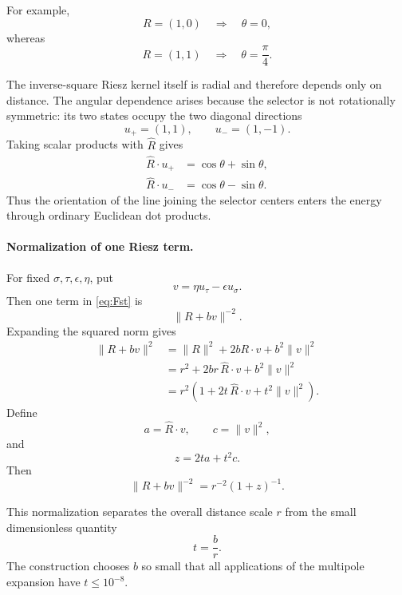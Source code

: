 \documentclass[12pt,a4paper]{article}
\newcommand{\norm}[1]{\lVert #1\rVert}
\begin{document}
For example,
\[
R=(1,0)
\quad\Longrightarrow\quad
\theta=0,
\]
whereas
\[
R=(1,1)
\quad\Longrightarrow\quad
\theta=\frac{\pi}{4}.
\]

The inverse-square Riesz kernel itself is radial and therefore depends
only on distance.  The angular dependence arises because the selector
is not rotationally symmetric: its two states occupy the two diagonal
directions
\[
u_+=(1,1),
\qquad
u_-=(1,-1).
\]
Taking scalar products with $\widehat R$ gives
\begin{align}
\widehat R\cdot u_+
&=\cos\theta+\sin\theta,
\label{eq:app-dotplus}\\
\widehat R\cdot u_-
&=\cos\theta-\sin\theta.
\label{eq:app-dotminus}
\end{align}
Thus the orientation of the line joining the selector centers enters
the energy through ordinary Euclidean dot products.

\paragraph{Normalization of one Riesz term.}

For fixed $\sigma,\tau,\epsilon,\eta$, put
\begin{equation}
\label{eq:app-vdef}
v=\eta u_\tau-\epsilon u_\sigma.
\end{equation}
Then one term in \eqref{eq:Fst} is
\[
\norm{R+bv}^{-2}.
\]
Expanding the squared norm gives
\begin{align}
\norm{R+bv}^{2}
&=
\norm R^2+2bR\cdot v+b^2\norm v^2
\nonumber\\
&=
r^2+2br\,\widehat R\cdot v+b^2\norm v^2
\nonumber\\
&=
r^2
\left(
1+2t\,\widehat R\cdot v+t^2\norm v^2
\right).
\label{eq:app-norm-expand}
\end{align}
Define
\begin{equation}
\label{eq:app-ac}
a=\widehat R\cdot v,
\qquad
c=\norm v^2,
\end{equation}
and
\begin{equation}
\label{eq:app-z}
z=2ta+t^2c.
\end{equation}
Then
\begin{equation}
\label{eq:app-riesz-normalized}
\norm{R+bv}^{-2}
=
r^{-2}(1+z)^{-1}.
\end{equation}

This normalization separates the overall distance scale $r$ from the
small dimensionless quantity
\[
t=\frac br.
\]
The construction chooses $b$ so small that all applications of the
multipole expansion have $t\le10^{-8}$.
\end{document}

